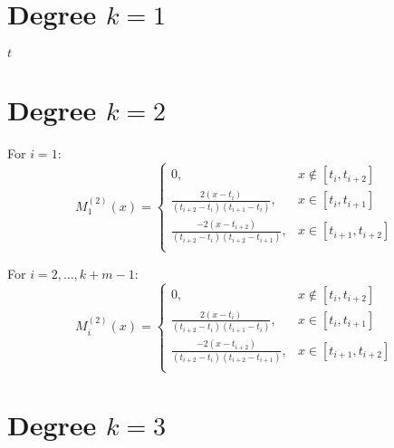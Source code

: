 \documentclass{article}
\begin{document}
\section{Degree $k = 1$}

$t$

\section{Degree $k = 2$}

For $i = 1$:
\[
    M^{(2)}_1 (x) = \begin{cases}
        0 ,&  x \notin [t_i, t_{i+2}] \\
        \frac{2(x - t_i)}{(t_{i+2} - t_i)(t_{i+1} - t_i)} ,& x \in [t_i, t_{i+1}] \\
        \frac{-2(x - t_{i+2})}{(t_{i+2} - t_i)(t_{i+2} - t_{i+1})} ,& x \in [t_{i+1}, t_{i+2}] \\
    \end{cases}
\]


For $i = 2, \dots, k + m - 1$: 
\[
    M^{(2)}_i (x) = \begin{cases}
        0 ,& x \notin [t_i, t_{i+2}] \\
        \frac{2(x - t_i)}{(t_{i+2} - t_i)(t_{i+1} - t_i)} ,& x \in [t_i, t_{i+1}] \\
        \frac{-2(x - t_{i+2})}{(t_{i+2} - t_i)(t_{i+2} - t_{i+1})} ,& x \in [t_{i+1}, t_{i+2}] \\
    \end{cases}
\]

\section{Degree $k = 3$}
\end{document}
